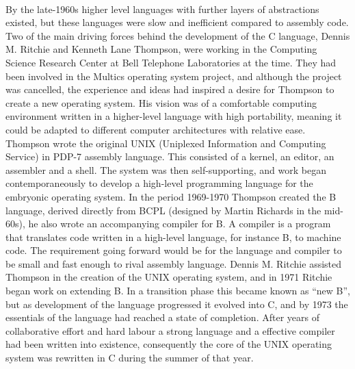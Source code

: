 \documentclass{report}%
\begin{document}
\paragraph{}
By the late-1960s higher level languages with further layers of abstractions existed, but these languages were slow and inefficient compared to assembly code. Two of the main driving forces behind the development of the C language, Dennis M. Ritchie and Kenneth Lane Thompson, were working in the Computing Science Research Center at Bell Telephone Laboratories at the time. They had been involved in the Multics operating system project, and although the project was cancelled, the experience and ideas had inspired a desire for Thompson to create a new operating system. His vision was of a comfortable computing environment written in a higher-level language with high portability, meaning it could be adapted to different computer architectures with relative ease. Thompson wrote the original UNIX (Uniplexed Information and Computing Service) in PDP-7 assembly language. This consisted of a kernel, an editor, an assembler and a shell. The system was then self-supporting, and work began contemporaneously to develop a high-level programming language for the embryonic operating system. In the period 1969-1970 Thompson created the B language, derived directly from BCPL (designed by Martin Richards in the mid-60s), he also wrote an accompanying compiler for B.  A compiler is a program that translates code written in a high-level language, for instance B, to machine code. The requirement going forward would be for the language and compiler to be small and fast enough to rival assembly language. Dennis M. Ritchie assisted Thompson in the creation of the UNIX operating system, and in 1971 Ritchie began work on extending B. In a transition phase this became known as “new B”, but as development of the language progressed it evolved into C, and by 1973 the essentials of the language had reached a state of completion. After years of collaborative effort and hard labour a strong language and a effective compiler had been written into existence, consequently the core of the UNIX operating system was rewritten in C during the summer of that year.
\end{document}

